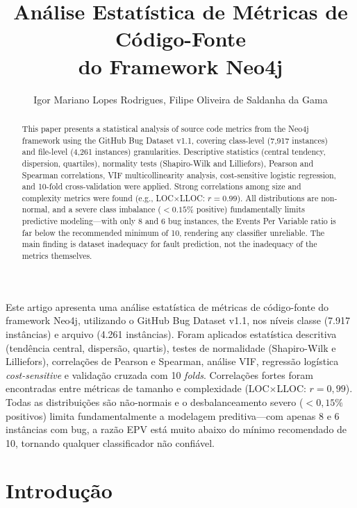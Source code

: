 \documentclass[12pt]{article}
\title{Análise Estatística de Métricas de Código-Fonte\\do Framework Neo4j}
\author{Igor Mariano Lopes Rodrigues\inst{1}, Filipe Oliveira de Saldanha da Gama\inst{1}}
\begin{document}
\maketitle

\begin{abstract}
This paper presents a statistical analysis of source code metrics from the Neo4j
framework using the GitHub Bug Dataset v1.1, covering class-level (7{,}917 instances)
and file-level (4{,}261 instances) granularities. Descriptive statistics (central
tendency, dispersion, quartiles), normality tests (Shapiro-Wilk and Lilliefors),
Pearson and Spearman correlations, VIF multicollinearity analysis, cost-sensitive
logistic regression, and 10-fold cross-validation were applied. Strong correlations
among size and complexity metrics were found (e.g., LOC$\times$LLOC: $r = 0.99$).
All distributions are non-normal, and a severe class imbalance ($<0.15\%$ positive)
fundamentally limits predictive modeling---with only 8 and 6 bug instances, the
Events Per Variable ratio is far below the recommended minimum of 10, rendering
any classifier unreliable. The main finding is dataset inadequacy for fault
prediction, not the inadequacy of the metrics themselves.
\end{abstract}

\begin{resumo}
Este artigo apresenta uma análise estatística de métricas de código-fonte do
framework Neo4j, utilizando o GitHub Bug Dataset v1.1, nos níveis classe (7.917
instâncias) e arquivo (4.261 instâncias). Foram aplicados estatística descritiva
(tendência central, dispersão, quartis), testes de normalidade (Shapiro-Wilk e
Lilliefors), correlações de Pearson e Spearman, análise VIF, regressão logística
\textit{cost-sensitive} e validação cruzada com 10 \textit{folds}. Correlações
fortes foram encontradas entre métricas de tamanho e complexidade (LOC$\times$LLOC:
$r = 0{,}99$). Todas as distribuições são não-normais e o desbalanceamento severo
($<0{,}15\%$ positivos) limita fundamentalmente a modelagem preditiva---com apenas
8 e 6 instâncias com bug, a razão EPV está muito abaixo do mínimo recomendado de
10, tornando qualquer classificador não confiável.
\end{resumo}

\section{Introdução} \label{sec:intro}
\end{document}
